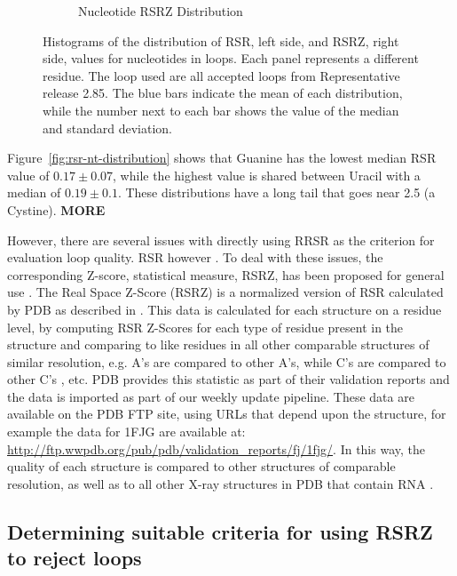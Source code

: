 \begin{figure}[ht]
\begin{subfigure}[b]{0.49\textwidth}
    \caption{Nucleotide RSRZ Distribution}
    \label{fig:rsrz-nt-distribution}
  \end{subfigure}
  \caption{Histograms of the distribution of RSR, left side, and RSRZ, right
  side, values for nucleotides in loops. Each panel represents a different
  residue. The loop used are all accepted loops from Representative release
  2.85. The blue bars indicate the mean of each distribution, while the number
  next to each bar shows the value of the median and standard deviation.}
  \label{fig:nt-quality-distribution}
\end{figure}

Figure~\ref{fig:rsr-nt-distribution} shows that Guanine has the lowest median
RSR value of $0.17 \pm 0.07$, while the highest value is shared between Uracil
with a median of $0.19 \pm 0.1$. These distributions have a long tail that goes
near 2.5 (a Cystine). \textbf{MORE}

However, there are several issues with directly using RRSR as the criterion for
evaluation loop quality. RSR however \cite{Tickle2012}. To deal with these
issues, the corresponding Z-score, statistical measure, RSRZ, has been proposed
for general use \cite{Gore2012}. The Real Space Z-Score (RSRZ) is a normalized
version of RSR calculated by PDB as described in \cite{Gore2012}. This data is
calculated for each structure on a residue level, by computing RSR Z-Scores for
each type of residue present in the structure and comparing to like residues in
all other comparable structures of similar resolution, e.g. A's are compared to
other A's, while C's are compared to other C's \cite{Gore2012, Kleywegt2004a},
etc. PDB provides this statistic as part of their validation reports and the
data is imported as part of our weekly update pipeline. These data are available
on the PDB FTP site, using URLs that depend upon the structure, for example the
data for 1FJG are available at:
\href{http://ftp.wwpdb.org/pub/pdb/validation\_reports/fj/1fjg/}{http://ftp.wwpdb.org/pub/pdb/validation\_reports/fj/1fjg/}.
In this way, the quality of each structure is compared to other structures of
comparable resolution, as well as to all other X-ray structures in PDB that
contain RNA \cite{Gore2012}.

\subsection{Determining suitable criteria for using RSRZ to reject loops}

